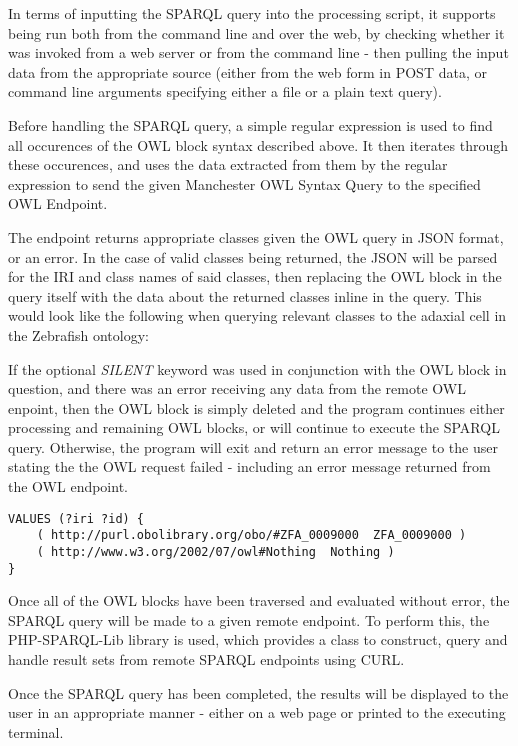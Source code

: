 \documentclass{article}
\begin{document}
In terms of inputting the SPARQL query into the processing script, it supports
being run both from the command line and over the web, by checking whether it
was invoked from a web server or from the command line - then pulling the input
data from the appropriate source (either from the web form in POST data, or command
line arguments specifying either a file or a plain text query).

Before handling the SPARQL query, a simple regular expression is used to find
all occurences of the OWL block syntax described above. It then iterates through
these occurences, and uses the data extracted from them by the regular
expression to send the given Manchester OWL Syntax Query to the specified OWL
Endpoint.

The endpoint returns appropriate classes given the OWL query in JSON format, or an 
error. In the case of valid classes being returned, the JSON will be parsed for
the IRI and class names of said classes, then replacing the OWL block in
the query itself with the data about the returned classes inline in the query.
This would look like the following when querying relevant classes to the adaxial
cell in the Zebrafish ontology\cite{zfin}:

If the optional \emph{SILENT} keyword was used in conjunction with the OWL block
in question, and there was an error receiving any data from the remote OWL
enpoint, then the OWL block is simply deleted and the program continues either
processing and remaining OWL blocks, or will continue to execute the SPARQL
query. Otherwise, the program will exit and return an error message to the user stating
the the OWL request failed - including an error message returned from the OWL endpoint.

\begin{lstlisting}
VALUES (?iri ?id) { 
    ( http://purl.obolibrary.org/obo/#ZFA_0009000  ZFA_0009000 ) 
    ( http://www.w3.org/2002/07/owl#Nothing  Nothing )
}
\end{lstlisting}

Once all of the OWL blocks have been traversed and evaluated without error, the
SPARQL query will be made to a given remote endpoint. To perform this, the 
PHP-SPARQL-Lib library\cite{phpsparqllib} is used, which provides a class to 
construct, query and handle result sets from remote SPARQL endpoints using CURL.

Once the SPARQL query has been completed, the results will be displayed to the
user in an appropriate manner - either on a web page or printed to the executing
terminal.
\end{document}
